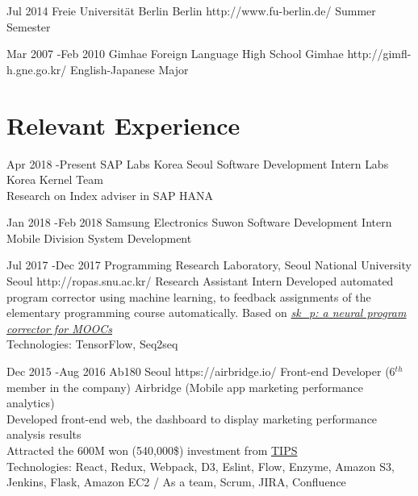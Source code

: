 \documentclass[10pt]{article} %
\begin{document}

\jobnocontent
{Jul 2014}{}
{Freie Universität Berlin}
{Berlin}
{http://www.fu-berlin.de/}
{Summer Semester}




\jobnocontent
{Mar 2007 -}{Feb 2010}
{Gimhae Foreign Language High School}
{Gimhae}
{http://gimfl-h.gne.go.kr/}
{English-Japanese Major}
\fi

\section{Relevant Experience}

\job
{Apr 2018 -}{Present}
{SAP Labs Korea}
{Seoul}
{}
{Software Development Intern}
{Labs Korea Kernel Team\\
Research on Index adviser in SAP HANA}

\job
{Jan 2018 -}{Feb 2018}
{Samsung Electronics}
{Suwon}
{}
{Software Development Intern}
{Mobile Division System Development}

\job
{Jul 2017 -}{Dec 2017}
{Programming Research Laboratory, Seoul National University}
{Seoul}
{http://ropas.snu.ac.kr/}
{Research Assistant Intern}
{Developed automated program corrector using machine learning, to feedback assignments of the elementary programming course automatically. Based on \textit{\href{https://dl.acm.org/citation.cfm?id=2989222}{
sk\_p: a neural program corrector for MOOCs}}\\
Technologies: TensorFlow, Seq2seq}

\job
{Dec 2015 -}{Aug 2016}
{Ab180}
{Seoul}
{https://airbridge.io/}
{Front-end Developer (6$^{th}$ member in the company)}
{Airbridge (Mobile app marketing performance analytics)\\
Developed front-end web, the dashboard to display marketing performance analysis results\\
Attracted the 600M won (540,000\$) investment from \href{http://www.jointips.or.kr/}{TIPS}\\
Technologies: React, Redux, Webpack, D3, Eslint, Flow, Enzyme, Amazon S3, Jenkins, Flask, Amazon EC2 / As a team, Scrum, JIRA, Confluence}
\end{document}
